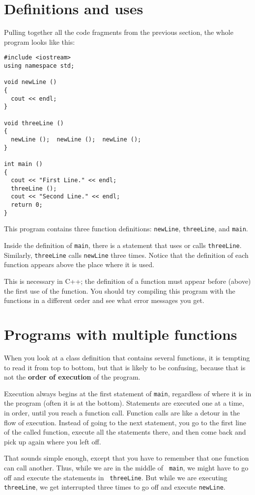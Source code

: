 \section {Definitions and uses}

Pulling together all the code fragments from the previous
section, the whole program looks like this:

\begin{verbatim}
#include <iostream>
using namespace std;

void newLine ()
{
  cout << endl;
}

void threeLine ()
{
  newLine ();  newLine ();  newLine ();
}

int main ()
{
  cout << "First Line." << endl;
  threeLine ();
  cout << "Second Line." << endl;
  return 0;
}
\end{verbatim}

This program contains three function definitions: {\tt newLine},
{\tt threeLine}, and {\tt main}.

Inside the definition of {\tt main}, there is a statement that
uses or calls {\tt threeLine}.  Similarly, {\tt threeLine} calls
{\tt newLine} three times.  Notice that the definition of each
function appears above the place where it is used.

This is necessary in C++; the definition of a function must
appear before (above) the first use of the function.  You
should try compiling this program with the functions in a
different order and see what error messages you get.

\section {Programs with multiple functions}

When you look at a class definition that contains several functions, it
is tempting to read it from top to bottom, but that is likely to be
confusing, because that is not the {\bf order of execution} of the
program.

Execution always begins at the first statement of {\tt main},
regardless of where it is in the program (often it is at the bottom).
Statements are executed one at a time, in order, until you reach a
function call.  Function calls are like a detour in the flow of
execution.  Instead of going to the next statement, you go to the
first line of the called function, execute all the statements there,
and then come back and pick up again where you left off.

That sounds simple enough, except that you have to remember that one
function can call another.  Thus, while we are in the middle of {\tt
main}, we might have to go off and execute the statements in {\tt
threeLine}.  But while we are executing {\tt threeLine}, we get
interrupted three times to go off and execute {\tt newLine}.

